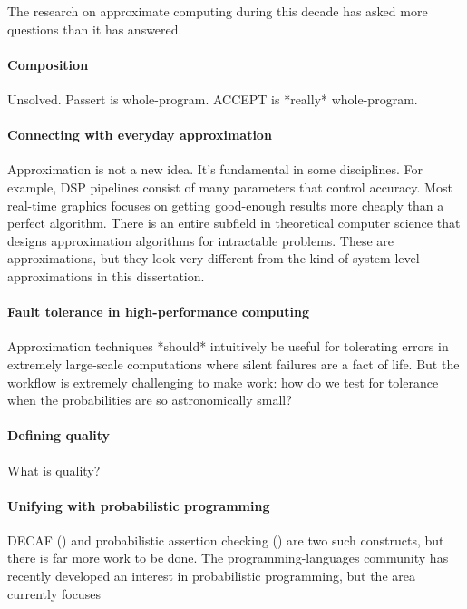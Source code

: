 The research on approximate computing during this decade
has asked more questions than it has answered.

\paragraph{Composition}
Unsolved. Passert is whole-program. ACCEPT is *really* whole-program.

\paragraph{Connecting with everyday approximation}
Approximation is not a new idea.
It's fundamental in some disciplines.
For example, DSP pipelines consist of many parameters that control accuracy.
Most real-time graphics focuses on getting good-enough results more cheaply
than a perfect algorithm.
There is an entire subfield in theoretical computer science that designs
approximation algorithms for intractable problems.
These are approximations, but they look very different from the kind of
system-level approximations in this dissertation.

\paragraph{Fault tolerance in high-performance computing}
Approximation techniques *should* intuitively be useful for tolerating errors
in extremely large-scale computations where silent failures are a fact of
life.
But the workflow is extremely challenging to make work:
how do we test for tolerance when the probabilities are so astronomically
small?

\paragraph{Defining quality}
What is quality?

\paragraph{Unifying with probabilistic programming}
DECAF () and probabilistic assertion checking ()
are two such constructs,
but there is far more work to be done.
The programming-languages community has recently developed an interest in
probabilistic programming, but the area currently focuses 
